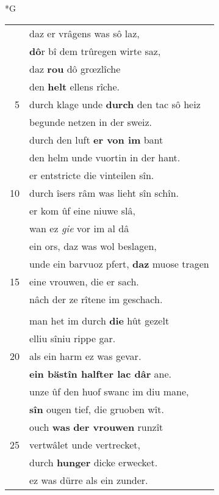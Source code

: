 \documentclass[8pt,a4paper,notitlepage]{article}
\begin{document}
\newpage
\begin{table}[ht]
\begin{minipage}[t]{0.5\linewidth}
\small
\begin{center}*G
\end{center}
\begin{tabular}{rl}
 & daz er vrâgens was sô laz,\\ 
 & \textbf{dô}r bî dem trûregen wirte saz,\\ 
 & daz \textbf{rou} dô grœzlîche\\ 
 & den \textbf{helt} ellens rîche.\\ 
5 & durch klage unde \textbf{durch} den tac sô heiz\\ 
 & begunde netzen in der sweiz.\\ 
 & durch den luft \textbf{er von im} bant\\ 
 & den helm unde vuortin in der hant.\\ 
 & er entstricte die vinteilen sîn.\\ 
10 & durch îsers râm was lieht sîn schîn.\\ 
 & er kom ûf eine niuwe slâ,\\ 
 & wan ez \textit{gie} vor im al dâ\\ 
 & ein ors, daz was wol beslagen,\\ 
 & unde ein barvuoz pfert, \textbf{daz} muose tragen\\ 
15 & eine vrouwen, die er sach.\\ 
 & nâch der ze rîtene im geschach.\\ 
 & \textbf{\begin{large}D\end{large}az} pfert \textbf{gein} kumber was verselt:\\ 
 & man het im durch \textbf{die} hût gezelt\\ 
 & elliu sîniu rippe gar.\\ 
20 & als ein harm ez was gevar.\\ 
 & \textbf{ein bästîn halfter lac dâr} ane.\\ 
 & unze ûf den huof swanc im diu mane,\\ 
 & \textbf{sîn} ougen tief, die gruoben wît.\\ 
 & ouch \textbf{was} \textbf{der vrouwen} runzît\\ 
25 & vertwâlet unde vertrecket,\\ 
 & durch \textbf{hunger} dicke erwecket.\\ 
 & ez was dürre als ein zunder.\\ 

\end{tabular}
\end{minipage}
\end{table}
\end{document}
